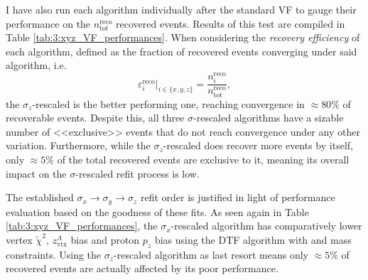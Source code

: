 I have also run each algorithm individually after the standard VF to gauge their performance on the $n^\text{reco}_\text{tot}$ recovered events.
Results of this test are compiled in Table \ref{tab:3:xyz_VF_performances}.
When considering the \textit{recovery efficiency} of each algorithm, defined as the fraction of recovered events converging under said algorithm, i.e.
\begin{equation}
	\varepsilon^\text{reco}_i \rvert_{i\in\{x,y,z\}} = \frac{n_i^\text{reco}}{n_\text{tot}^\text{reco}},
\end{equation}
the $\sigma_z$-rescaled is the better performing one, reaching convergence in $\approx 80\%$ of recoverable events.
Despite this, all three $\sigma$-rescaled algorithms have a sizable number of <<exclusive>> events that do not reach convergence under any other variation.
Furthermore, while the $\sigma_z$-rescaled does recover more events by itself, only $\approx 5\%$ of the total recovered events are exclusive to it, meaning its overall impact on the $\sigma$-rescaled refit process is low.

The established $\sigma_x \rightarrow \sigma_y \rightarrow \sigma_z$ refit order is justified in light of performance evaluation based on the goodness of these fits.
As seen again in Table \ref{tab:3:xyz_VF_performances}, the $\sigma_x$-rescaled algorithm has comparatively lower vertex $\tilde{\chi}^2$, $z_\text{vtx}^\Lambda$ bias and proton $p_z$ bias using the DTF algorithm with \jpsi and \lz mass constraints.
Using the $\sigma_z$-rescaled algorithm as last resort means only $\approx 5\%$ of recovered events are actually affected by its poor performance.

%

